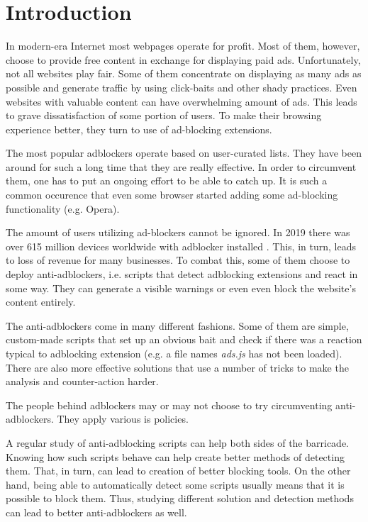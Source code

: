 \chapter*{Introduction}

In modern-era Internet most webpages operate for profit. Most of them, however, choose to provide free content
in exchange for displaying paid ads. Unfortunately, not all websites play fair. Some of them
concentrate on displaying as many ads as possible and generate traffic by using click-baits 
and other shady practices. Even websites with valuable content can have overwhelming amount 
of ads. This leads to grave dissatisfaction of some portion of users. To make their browsing experience better,
they turn to use of ad-blocking extensions.

The most popular adblockers operate based on user-curated lists. They have been around for such a long
time that they are really effective. In order to circumvent them, one has to put an ongoing effort to be able
to catch up. It is such a common occurence that even some browser started adding some ad-blocking
functionality (e.g. Opera).

The amount of users utilizing ad-blockers cannot be ignored. In 2019 there was over 615 million devices worldwide
with adblocker installed \cite{pagefair:adblock-report}. This, in turn, leads to loss of revenue for many businesses.
To combat this, some of them choose to deploy anti-adblockers, i.e. scripts that detect adblocking extensions
and react in some way. They can generate a visible warnings or even even block the website's content entirely.

The anti-adblockers come in many different fashions. Some of them are simple, custom-made scripts that 
set up an obvious bait and check if there was a reaction typical to adblocking extension (e.g. a file names \emph{ads.js}
has not been loaded). There are also more effective solutions that use a number of tricks to make the analysis
and counter-action harder.

The people behind adblockers may or may not choose to try circumventing anti-adblockers.
They apply various is policies. \todo{}

A regular study of anti-adblocking scripts can help both sides of the barricade. Knowing how such scripts behave
can help create better methods of detecting them. That, in turn, can lead to creation of better blocking tools.
On the other hand, being able to automatically detect some scripts usually means that it is possible
to block them. Thus, studying different solution and detection methods can lead to better anti-adblockers as well.

